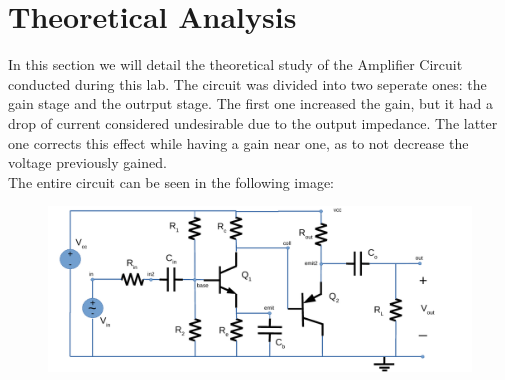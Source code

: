 \section{Theoretical Analysis}
\label{sec:analysis}

In this section we will detail the theoretical study of the Amplifier Circuit conducted during this lab. The circuit was divided into two seperate ones: the gain stage and the outrput stage. The first one increased the gain, but it had a drop of current considered undesirable due to the output impedance. The latter one corrects this effect while having a gain near one, as to not decrease the voltage previously gained.\\
The entire circuit can be seen in the following image:\\


\FloatBarrier

\begin{figure}
  \includegraphics[scale=0.7]{circuit.pdf}
  \caption{}
  \label{}
\end{figure}
\FloatBarrier


